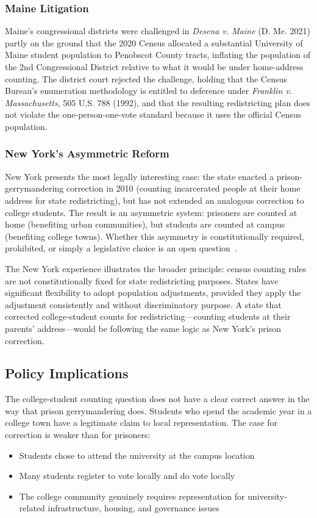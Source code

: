 \subsubsection{Maine Litigation}

Maine's congressional districts were challenged in \emph{Desena v. Maine} (D. Me. 2021) partly on the ground that the 2020 Census allocated a substantial University of Maine student population to Penobscot County tracts, inflating the population of the 2nd Congressional District relative to what it would be under home-address counting. The district court rejected the challenge, holding that the Census Bureau's enumeration methodology is entitled to deference under \emph{Franklin v. Massachusetts}, 505 U.S. 788 (1992), and that the resulting redistricting plan does not violate the one-person-one-vote standard because it uses the official Census population.~\citep{desena2021}

\subsubsection{New York's Asymmetric Reform}

New York presents the most legally interesting case: the state enacted a prison-gerrymandering correction in 2010 (counting incarcerated people at their home address for state redistricting), but has not extended an analogous correction to college students. The result is an asymmetric system: prisoners are counted at home (benefiting urban communities), but students are counted at campus (benefiting college towns). Whether this asymmetry is constitutionally required, prohibited, or simply a legislative choice is an open question~\citep{brewer2011prison}.

The New York experience illustrates the broader principle: census counting rules are not constitutionally fixed for state redistricting purposes. States have significant flexibility to adopt population adjustments, provided they apply the adjustment consistently and without discriminatory purpose. A state that corrected college-student counts for redistricting---counting students at their parents' address---would be following the same logic as New York's prison correction.

\subsection{Policy Implications}

The college-student counting question does not have a clear correct answer in the way that prison gerrymandering does. Students who spend the academic year in a college town have a legitimate claim to local representation. The case for correction is weaker than for prisoners:
\begin{itemize}
    \item Students chose to attend the university at the campus location
    \item Many students register to vote locally and do vote locally
    \item The college community genuinely requires representation for university-related infrastructure, housing, and governance issues
\end{itemize}

